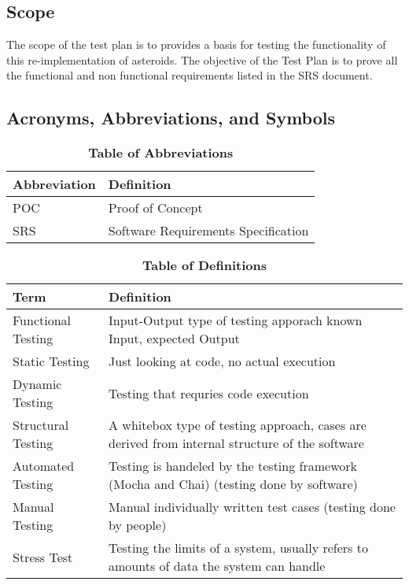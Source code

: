 \documentclass[12pt, titlepage]{article}
\begin{document}
\subsection{Scope}
The scope of the test plan is to provides a basis for testing the functionality of this re-implementation of asteroids. The objective of the Test Plan is to prove all the functional and non functional requirements listed in the SRS document.

\subsection{Acronyms, Abbreviations, and Symbols}

\begin{table}[hbp]
\caption{\textbf{Table of Abbreviations}} \label{Table}

\begin{tabularx}{\textwidth}{p{3cm}X}
\toprule
\textbf{Abbreviation} & \textbf{Definition} \\
\midrule
POC & Proof of Concept\\
SRS & Software Requirements Specification\\
\bottomrule
\end{tabularx}

\end{table}

\begin{table}[!htbp]
\caption{\textbf{Table of Definitions}} \label{Table}

\begin{tabularx}{\textwidth}{p{3cm}X}
\toprule
\textbf{Term} & \textbf{Definition}\\
\midrule
Functional Testing & Input-Output type of testing apporach known Input, expected Output\\
Static Testing & Just looking at code, no actual execution\\
Dynamic Testing & Testing that requries code execution\\
Structural Testing & A whitebox type of testing approach, cases are derived from internal structure of the software\\
Automated Testing & Testing is handeled by the testing framework (Mocha and Chai) (testing done by software)\\
Manual Testing & Manual individually written test cases (testing done by people)\\
Stress Test & Testing the limits of a system, usually refers to amounts of data the system can handle\\
\bottomrule
\end{tabularx}

\end{table}
\end{document}
